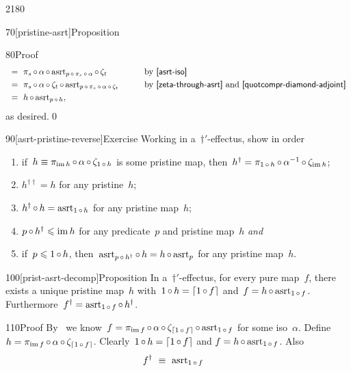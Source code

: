 \begin{parsec}{2180}
\begin{point}{70}[pristine-asrt]{Proposition}
\begin{point}{80}{Proof}
\begin{alignat*}{2}
   & \ =\  \pi_s \after \alpha \after \asrt_{p\after\pi_s \after \alpha} \after \zeta_t 
   &\qquad&\text{by \sref{asrt-iso}}\\
   & \ =\  \pi_s \after \alpha \after \zeta_t \after \asrt_{p\after\pi_s \after \alpha \after \zeta_t} 
    &\qquad& \text{by \sref{zeta-through-asrt}
                    and \sref{quotcompr-diamond-adjoint} }\\
   & \ = \ h \after \asrt_{p \after h},
\end{alignat*}
as desired.\qed
\end{point}
\end{point}
\begin{point}{90}[asrt-pristine-reverse]{Exercise}%
Working in a~$\dagger'$-effectus, show in order
\begin{enumerate}
    \item if~$h \equiv \pi_{\operatorname{im} h} \mathop{\circ} \alpha \mathop{\circ} \zeta_{1 \mathop{\circ} h}$
            is some pristine map,
            then~$h^\dagger = \pi_{1 \mathop{\circ} h} \mathop{\circ} \alpha^{-1} \mathop{\circ} \zeta_{\operatorname{im} h}$;
    \item $h^{\dagger\dagger} = h$ for any pristine~$h$;
    \item $h^\dagger \mathop{\circ} h = \mathrm{asrt}_{1 \mathop{\circ} h}$ for any pristine map~$h$;
    \item $p \mathop{\circ} h^\dagger \leqslant \operatorname{im} h$ for any predicate~$p$
        and pristine map~$h$ \emph{and}
    \item
        if~$p \leqslant 1 \mathop{\circ} h$,
        then~$\mathrm{asrt}_{p\mathop{\circ} h^\dagger} \mathop{\circ} h = h \mathop{\circ} \mathrm{asrt}_p$
        for any pristine map~$h$.
\end{enumerate}
\end{point}
\spacingfix{}
\begin{point}{100}[prist-asrt-decomp]{Proposition}%
In a~$\dagger'$-effectus,
        for every pure map~$f$,
    there exists a unique pristine map~$h$
    with~$1 \mathop{\circ} h = \left\lceil1 \mathop{\circ} f\right\rceil$
    and~$f = h \mathop{\circ} \mathrm{asrt}_{1 \mathop{\circ} f}$.
    Furthermore~$f^\dagger = \mathrm{asrt}_{1 \mathop{\circ} f}\mathop{\circ} h^\dagger$.
\begin{point}{110}{Proof}%
By~
 we know~$f = \pi_{\operatorname{im} f} \mathop{\circ} \alpha \mathop{\circ} \zeta_{\left\lceil1 \mathop{\circ} f\right\rceil}
        \mathop{\circ} \mathrm{asrt}_{1 \mathop{\circ} f}$
        for some iso~$\alpha$.
Define~$h = \pi_{\operatorname{im} f} \mathop{\circ} \alpha \mathop{\circ} \zeta_{\left\lceil1 \mathop{\circ} f\right\rceil}$.
Clearly~$1 \mathop{\circ} h = \left\lceil1 \mathop{\circ} f\right\rceil$
    and $f = h \mathop{\circ} \mathrm{asrt}_{1 \mathop{\circ} f}$.
    Also
    \begin{alignat*}{2}
        f^\dagger &\ \equiv\ 
        \asrt_{1 \after f}

\end{alignat*}
\end{point}
\end{point}
\end{parsec}
